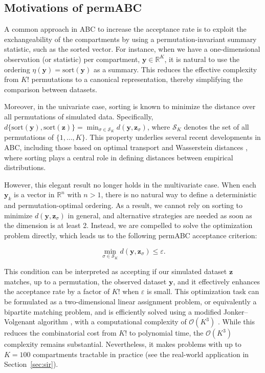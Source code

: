 \documentclass[11pt,a4paper]{article}
\def\obsdata{\mathbf{y}}
\def\simdata{\mathbf{z}}
\theoremstyle{plain}
\theoremstyle{definition}
\theoremstyle{remark}
\begin{document}
\subsection{Motivations of permABC}

A common approach in ABC to increase the acceptance rate is to exploit the exchangeability of the compartments by using a permutation-invariant summary statistic, such as the sorted vector. For instance, when we have a one-dimensional observation (or statistic) per compartment, $\obsdata \in \mathbb{R}^K$, it is natural to use the ordering $\eta(\obsdata) = \text{sort}(\obsdata)$ as a summary. This reduces the effective complexity from $K!$ permutations to a canonical representation, thereby simplifying the comparison between datasets.

Moreover, in the univariate case, sorting is known to minimize the distance over all permutations of simulated data. Specifically, $d\{\text{sort}(\obsdata), \text{sort}(\simdata)\} = \min_{\sigma \in \mathcal{S}_K} d(\obsdata, \simdata_{\sigma})$, where $\mathcal{S}_K$ denotes the set of all permutations of $\{1,\dots,K\}$. This property underlies several recent developments in ABC, including those based on optimal transport and Wasserstein distances \citep{bernton2019approximate}, where sorting plays a central role in defining distances between empirical distributions.

However, this elegant result no longer holds in the multivariate case. When each $\obsdata_k$ is a vector in $\mathbb{R}^n$ with $n > 1$, there is no natural way to define a deterministic and permutation-optimal ordering. As a result, we cannot rely on sorting to minimize $d(\obsdata, \simdata_{\sigma})$ in general, and alternative strategies are needed as soon as the dimension is at least 2. Instead, we are compelled to solve the optimization problem directly, which leads us to the following permABC acceptance criterion:

\begin{equation}
    \label{eqopti}
    \min_{\sigma \in \mathcal{S}_K} d(\obsdata, \simdata_{\sigma}) \leq \varepsilon.
\end{equation}

This condition can be interpreted as accepting if our simulated dataset $\simdata$ matches, up to a permutation, the observed dataset $\obsdata$, and it effectively enhances the acceptance rate by a factor of $K!$ when $\varepsilon$ is small. This optimization task can be formulated as a two-dimensional linear assignment problem, or equivalently a bipartite matching problem, and is efficiently solved using a modified Jonker–Volgenant algorithm \citep{jonker1987shortest}, with a computational complexity of $\mathcal{O}(K^3)$ \citep{crouseImplementing2DRectangular2016a}.
While this reduces the combinatorial cost from $K!$ to polynomial time, the $\mathcal{O}(K^3)$ complexity remains substantial. Nevertheless, it makes problems with up to $K = 100$ compartments tractable in practice (see the real-world application in Section~\ref{sec:sir}).
\end{document}

